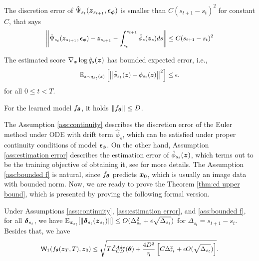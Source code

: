     \begin{assumption}\label{ass:continuity}
    The discretion error of $\hat{\Psi}_{s_{t}}(\boldsymbol{z}_{s_{t + 1}}, \boldsymbol{\epsilon}_{\boldsymbol{\phi}})$ is smaller than $C(s_{t + 1} - s_{t})^{2}$ for constant $C$, that says 
    \begin{equation}
        \small
        \left\|\hat{\Psi}_{s_{t}}(\boldsymbol{z}_{s_{t + 1}}, \boldsymbol{\epsilon}_{\boldsymbol{\phi}}) - \boldsymbol{z}_{s_{t + 1}} - \int_{s_{t}}^{s_{t + 1}}\hat{\phi}_{s}(\boldsymbol{z}_{s})ds\right\| \leq C(s_{t + 1} - s_{t})^{2}
    \end{equation} 
\end{assumption}
\begin{assumption}\label{ass:estimation error}
    The estimated score $\nabla_{\boldsymbol{z}}\log{\hat{q}_{s}(\boldsymbol{z})}$ has bounded expected error, i.e., 
    \begin{equation}
        \small
        \mathbb{E}_{\boldsymbol{z}\sim q_{s_{t}}(\boldsymbol{z})}\left[\left\|\hat{\phi}_{s_{t}}(\boldsymbol{z}) - \phi_{s_{t}}(\boldsymbol{z})\right\|^{2}\right] \leq \epsilon.
    \end{equation}
    for all $0 \leq t < T$. 
\end{assumption}
\begin{assumption}\label{ass:bounded f}
    For the learned model $f_{\boldsymbol{\theta}}$, it holds $\|f_{\boldsymbol{\theta}}\| \leq D$.
\end{assumption}

The Assumption \ref{ass:continuity} describes the discretion error of the Euler method under ODE with drift term $\hat{\phi}_{s}$, which can be satisfied under proper continuity conditions of model $\boldsymbol{\epsilon}_{\phi}$. On the other hand, Assumption \ref{ass:estimation error} describes the estimation error of $\hat{\phi}_{s_{t}}(\boldsymbol{z})$, which terms out to be the training objective of obtaining it, see \citep{song2020score} for more details. The Assumption \ref{ass:bounded f} is natural, since $f_{\boldsymbol{\theta}}$ predicts $\boldsymbol{x}_{0}$, which is usually an image data with bounded norm. Now, we are ready to prove the Theorem \ref{thm:cd upper bound}, which is presented by proving the following formal version.   

\begin{theorem}
    Under Assumptions \ref{ass:continuity}, \ref{ass:estimation error}, and \ref{ass:bounded f}, for all $\boldsymbol{\delta}_{s_{t}}$, we have $\mathbb{E}_{\boldsymbol{z}_{s_{t}}}[\|\boldsymbol{\delta}_{s_{t}}(\boldsymbol{z}_{s_{t}})\|] \leq  O(\Delta^{2} _{s_{t}} + \epsilon\sqrt{\Delta_{s_{t}}})$ for $\Delta_{s_{t}} = s_{t + 1} - s_{t}$. Besides that, we have 
	 	\begin{equation}
	 		\small
	 		\mathsf{W}_{1}(f_{\boldsymbol{\theta}}(\boldsymbol{z}_{T}, T), \boldsymbol{z}_{0}) \leq \sqrt{T\hat{\mathcal{L}}_{CD}^{Adv}(\boldsymbol{\theta}) + \frac{4D^{2}}{\eta}\left[C\Delta_{s_{t}}^{2} + \epsilon O(\sqrt{\Delta_{s_{t}}})\right]}.
	 	\end{equation}
\end{theorem}

